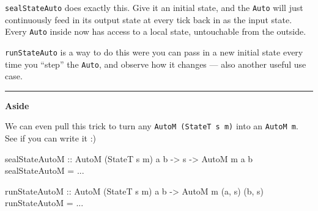 \documentclass[]{article}
\newenvironment{Shaded}{}{}
\newcommand{\CommentTok}[1]{\textcolor[rgb]{0.38,0.63,0.69}{\textit{#1}}}
\newcommand{\DataTypeTok}[1]{\textcolor[rgb]{0.56,0.13,0.00}{#1}}
\newcommand{\FunctionTok}[1]{\textcolor[rgb]{0.02,0.16,0.49}{#1}}
\newcommand{\KeywordTok}[1]{\textcolor[rgb]{0.00,0.44,0.13}{\textbf{#1}}}
\newcommand{\NormalTok}[1]{#1}
\newcommand{\OtherTok}[1]{\textcolor[rgb]{0.00,0.44,0.13}{#1}}
\begin{document}
\begin{Shaded}
\end{Shaded}

\texttt{sealStateAuto} does exactly this. Give it an initial state, and the
\texttt{Auto} will just continuously feed in its output state at every tick back
in as the input state. Every \texttt{Auto} inside now has access to a local
state, untouchable from the outside.

\texttt{runStateAuto} is a way to do this were you can pass in a new initial
state every time you ``step'' the \texttt{Auto}, and observe how it changes ---
also another useful use case.

\begin{center}\rule{0.5\linewidth}{\linethickness}\end{center}

\textbf{Aside}

We can even pull this trick to turn any \texttt{AutoM\ (StateT\ s\ m)} into an
\texttt{AutoM\ m}. See if you can write it :)

\begin{Shaded}
\begin{Highlighting}[]
\OtherTok{sealStateAutoM ::} \DataTypeTok{AutoM}\NormalTok{ (}\DataTypeTok{StateT}\NormalTok{ s m) a b }\OtherTok{->}\NormalTok{ s }\OtherTok{->} \DataTypeTok{AutoM}\NormalTok{ m a b}
\NormalTok{sealStateAutoM }\FunctionTok{=} \FunctionTok{...}

\OtherTok{runStateAutoM ::} \DataTypeTok{AutoM}\NormalTok{ (}\DataTypeTok{StateT}\NormalTok{ s m) a b }\OtherTok{->} \DataTypeTok{AutoM}\NormalTok{ m (a, s) (b, s)}
\NormalTok{runStateAutoM }\FunctionTok{=} \FunctionTok{...}
\end{Highlighting}
\end{Shaded}
\end{document}
